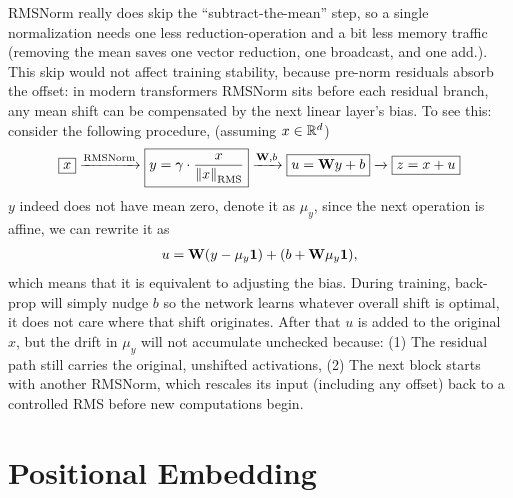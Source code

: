 \documentclass[11pt]{article}  %
\begin{document}
RMSNorm really does skip the “subtract-the-mean” step, so a single normalization needs one less reduction-operation and a bit less memory traffic (removing the mean saves one vector reduction, one broadcast, and one add.). 
This skip would not affect training stability, because pre-norm residuals absorb the offset: in modern transformers RMSNorm sits before each residual branch, any mean shift can be compensated by the next linear layer's bias.
To see this: consider the following procedure, (assuming $x \in \mathbb{R}^d$)
\begin{align*}
  \boxed{x} \xrightarrow{\text{RMSNorm}} \boxed{y = \gamma \cdot \frac{x}{\left\lVert x \right\rVert_{\text{RMS}}}} \xrightarrow{\mathbf{W}, b} \boxed{u = \mathbf{W} y + b} \xrightarrow{} \boxed{z = x + u}
\end{align*}
$y$ indeed does not have mean zero, denote it as $\mu_{y}$, since the next operation is affine, we can rewrite it as 
\begin{align*}
  u = \mathbf{W}(y - \mu_{y}{\bf{1}}) + (b + \mathbf{W}\mu_{y}{\bf{1}}),
\end{align*}
which means that it is equivalent to adjusting the bias. 
During training, back-prop will simply nudge $b$ so the network learns whatever overall shift is optimal, it does not care where that shift originates.
After that $u$ is added to the original $x$, but the drift in $\mu_{y}$ will not accumulate unchecked because: (1) The residual path still carries the original, unshifted activations, (2) The next block starts with another RMSNorm, which rescales its input (including any offset) back to a controlled RMS before new computations begin.



\section{Positional Embedding}
\end{document}

